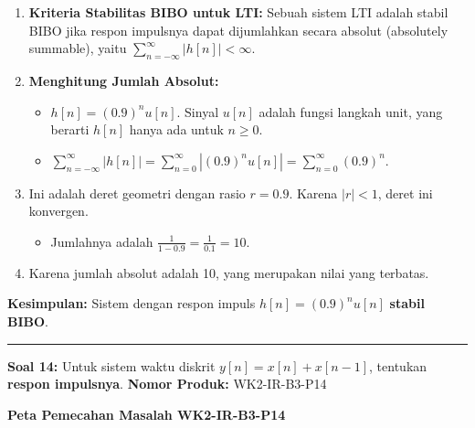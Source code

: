 \documentclass[
  letterpaper,
  DIV=11,
  numbers=noendperiod]{scrreprt}
\providecommand{\tightlist}{%
  \setlength{\itemsep}{0pt}\setlength{\parskip}{0pt}}
\begin{document}
\begin{enumerate}
\def\labelenumi{\arabic{enumi}.}
\tightlist
\item
  \textbf{Kriteria Stabilitas BIBO untuk LTI:} Sebuah sistem LTI adalah
  stabil BIBO jika respon impulsnya dapat dijumlahkan secara absolut
  (absolutely summable), yaitu
  \(\sum_{n=-\infty}^{\infty} |h[n]| < \infty\).
\item
  \textbf{Menghitung Jumlah Absolut:}

  \begin{itemize}
  \tightlist
  \item
    \(h[n] = (0.9)^n u[n]\). Sinyal \(u[n]\) adalah fungsi langkah unit,
    yang berarti \(h[n]\) hanya ada untuk \(n \ge 0\).
  \item
    \(\sum_{n=-\infty}^{\infty} |h[n]| = \sum_{n=0}^{\infty} |(0.9)^n u[n]| = \sum_{n=0}^{\infty} (0.9)^n\).
  \end{itemize}
\item
  Ini adalah deret geometri dengan rasio \(r = 0.9\). Karena
  \(|r| < 1\), deret ini konvergen.

  \begin{itemize}
  \tightlist
  \item
    Jumlahnya adalah \(\frac{1}{1 - 0.9} = \frac{1}{0.1} = 10\).
  \end{itemize}
\item
  Karena jumlah absolut adalah 10, yang merupakan nilai yang terbatas.
\end{enumerate}

\textbf{Kesimpulan:} Sistem dengan respon impuls \(h[n] = (0.9)^n u[n]\)
\textbf{stabil BIBO}.

\begin{center}\rule{0.5\linewidth}{0.5pt}\end{center}

\textbf{Soal 14:} Untuk sistem waktu diskrit \(y[n] = x[n] + x[n-1]\),
tentukan \textbf{respon impulsnya}. \textbf{Nomor Produk:} WK2-IR-B3-P14

\textbf{Peta Pemecahan Masalah WK2-IR-B3-P14}
\end{document}
